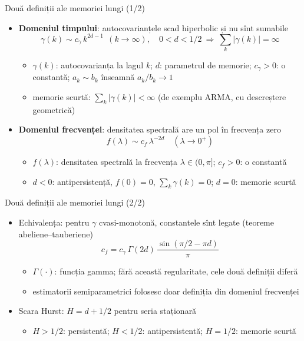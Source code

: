 \begin{frame}{Două definiții ale memoriei lungi (1/2)}
\itemsize{\small}
\begin{itemize}
    \item \textbf{Domeniul timpului}: autocovarianțele scad hiperbolic și nu sînt sumabile
    \[ \gamma(k) \sim c_\gamma\,k^{2d-1} \ \ (k \to \infty), \quad 0 < d < 1/2 \ \Rightarrow\ \sum_k|\gamma(k)| = \infty \]
    \begin{itemize}
        \item $\gamma(k)$: autocovarianța la lagul $k$; $d$: parametrul de memorie; $c_\gamma > 0$: o constantă; $a_k \sim b_k$ înseamnă $a_k/b_k \to 1$
        \item memorie scurtă: $\sum_k|\gamma(k)| < \infty$ (de exemplu ARMA, cu descreștere geometrică)
    \end{itemize}
    \item \textbf{Domeniul frecvenței}: densitatea spectrală are un pol în frecvența zero
    \[ f(\lambda) \sim c_f\,\lambda^{-2d} \quad (\lambda \to 0^+) \]
    \begin{itemize}
        \item $f(\lambda)$: densitatea spectrală la frecvența $\lambda \in (0, \pi]$; $c_f > 0$: o constantă
        \item $d < 0$: antipersistență, $f(0) = 0$, $\sum_k\gamma(k) = 0$; $d = 0$: memorie scurtă
    \end{itemize}
\end{itemize}
\end{frame}

\begin{frame}{Două definiții ale memoriei lungi (2/2)}
\itemsize{\small}
\begin{itemize}
    \item Echivalența: pentru $\gamma$ cvasi-monotonă, constantele sînt legate (teoreme abeliene--tauberiene) 
    \[ c_f = c_\gamma\,\Gamma(2d)\,\frac{\sin(\pi/2 - \pi d)}{\pi} \]
    \begin{itemize}
        \item $\Gamma(\cdot)$: funcția gamma; fără această regularitate, cele două definiții diferă
        \item estimatorii semiparametrici folosesc doar definiția din domeniul frecvenței
    \end{itemize}
    \item Scara Hurst: $H = d + 1/2$ pentru seria staționară
    \begin{itemize}
        \item $H > 1/2$: persistentă; $H < 1/2$: antipersistentă; $H = 1/2$: memorie scurtă
    \end{itemize}
\end{itemize}
\end{frame}

